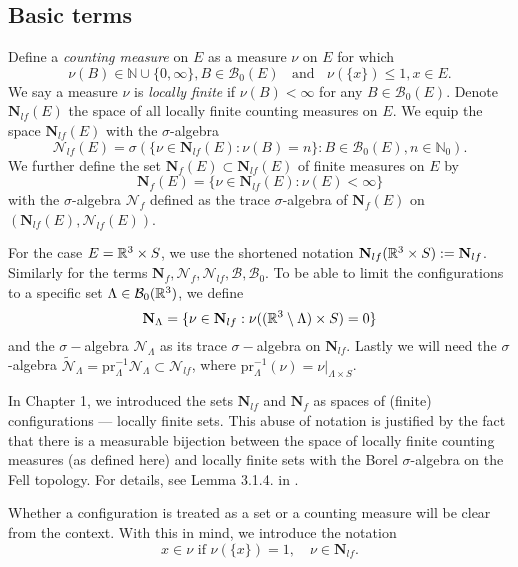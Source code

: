 \subsection{Basic terms}\label{sec:basicPP}
\begin{definition}\label{def:measures}
Define a \textit{counting measure} on $E$ as a measure $\nu$ on $E$ for which
$$\nu(B)\in\mathbb N \cup \{0,\infty\}, B\in\mathcal B_0(E)\;\;\text{ and } \; \; \nu(\{x\})\leq 1, x\in E.$$
We say a measure $\nu$ is \textit{locally finite} if $\nu(B)<\infty$ for any $B\in \mathcal  B_0(E)$. Denote $\mathbf N_{lf}(E)$ the space of all locally finite counting measures on $E$.
We equip the space $\mathbf N_{lf}(E)$ with the $\sigma$-algebra
$$\mathcal N_{lf}(E)=\sigma(\{\nu \in \mathbf N_{lf}(E): \nu(B)=n\}: B \in \mathcal B_0(E), n\in \mathbb N_0).$$
We further define the set $\mathbf N_f(E) \subset \mathbf N_{lf}(E)$ of finite measures on $E$ by
$$\mathbf N_f(E) = \{\nu \in \mathbf N_{lf}(E): \nu(E)<\infty\}$$
with the $\sigma$-algebra $\mathcal N_{f}$ defined as the trace $\sigma$-algebra of $\mathbf N_{f}(E)$ on $(\mathbf N_{lf}(E),\mathcal N_{lf}(E))$.\newline
\end{definition}

For the case $E={\mathbb R^3}\times S$, we use the shortened notation $\mathbf N_{lf}({\mathbb R^3}\times S) := \mathbf N_{lf}$. Similarly for the terms $\mathbf N_{f}, \mathcal N_{f}, \mathcal N_{lf}, \mathcal B, \mathcal B_0$. To be able to limit the configurations to a specific set $\Lambda \in \mathcal B_0({\mathbb R^3})$, we define
$$\mathbf N_\Lambda = \{ \nu \in \mathbf N_{lf}: \nu( ({\mathbb R^3} \setminus \Lambda) \times S) = 0 \}$$
and the $\sigma-$algebra $\mathcal N_\Lambda$ as its trace $\sigma-$algebra on $\mathbf N_{lf}$. Lastly we will need the $\sigma$-algebra $\mathcal {\tilde N}_\Lambda = \mathrm{pr}_\Lambda^{-1} \mathcal N_\Lambda \subset \mathcal N_{lf}$, where $\mathrm{pr}_\Lambda^{-1}(\nu)=\nu|_{\Lambda\times S}$.



\begin{remark}
	In Chapter 1, we introduced the sets $\mathbf N_{lf}$ and $\mathbf N_f$ as spaces of (finite) configurations --- locally finite sets. This abuse of notation is justified by the fact that there is a measurable bijection between the space of locally finite counting measures (as defined here) and locally finite sets with the Borel $\sigma$-algebra on the Fell topology. For details, see Lemma 3.1.4. in \cite{SchneiderWeil2008}.   

	Whether a configuration is treated as a set or a counting measure will be clear from the context. With this in mind, we introduce the notation 
	$$x\in \nu \text{ if } \nu(\{x\})=1, \quad \nu \in \mathbf N_{lf}.$$
\end{remark}

